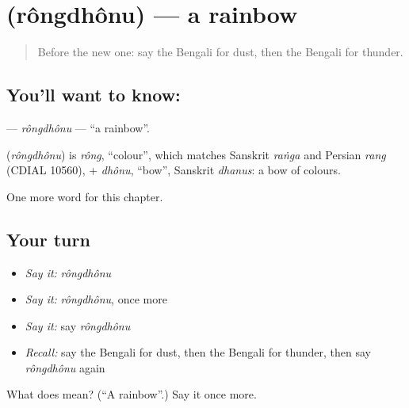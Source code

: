 \section[\texorpdfstring{\bn{রংধনু} (rôngdhônu)}{রংধনু (rôngdhônu)}]{ (rôngdhônu) — a rainbow}

\label{lesson:BN-C113-rongdhonu}



\begin{quote}
Before the new one: say the Bengali for dust, then the Bengali for thunder.
\end{quote}

\subsection*{You'll want to know: }
\textbf{} — \emph{rôngdhônu} — \textquotedblleft{}a rainbow\textquotedblright{}.

\begin{cousinweb}
\textbf{} (\emph{rôngdhônu}) is \emph{rông}, \textquotedblleft{}colour\textquotedblright{}, which matches Sanskrit \emph{raṅga} and Persian \emph{rang} (CDIAL 10560), + \emph{dhônu}, \textquotedblleft{}bow\textquotedblright{}, Sanskrit \emph{dhanus}: a bow of colours.
\end{cousinweb}

\begin{grammarlens}[title={What you've built}]
One more word for this chapter.
\end{grammarlens}

\subsection*{Your turn}
\begin{itemize}
\raggedright
  \item \emph{Say it:} \emph{rôngdhônu}
  \item \emph{Say it:} \emph{rôngdhônu}, once more
  \item \emph{Say it:} say \emph{rôngdhônu}
  \item \emph{Recall:} say the Bengali for dust, then the Bengali for thunder, then say \emph{rôngdhônu} again
\end{itemize}

\begin{tcolorbox}[breakable,colback=teal!4,colframe=teal!35!black,title={Before you move on}]
What does  mean? (\textquotedblleft{}A rainbow\textquotedblright{}.) Say it once more.
\end{tcolorbox}
